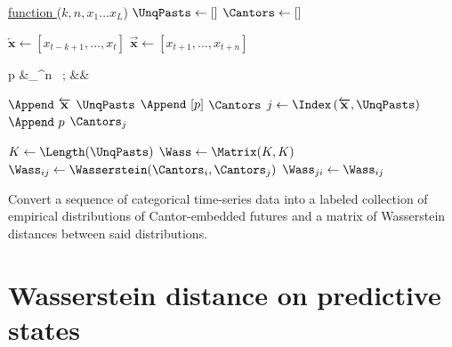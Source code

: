 \documentclass[draft,aps,pre,twocolumn,groupaddress,showkeys,nofootinbib,preprintnumbers,floatfix]{revtex4-2}
\begin{document}
\begin{algorithm}[t]
   
  
  \underline{function \CantorWasserstein} ($k,n,x_1\dots x_L$)\;
  $\UnqPasts \leftarrow \left[\right]$\; 
  $\Cantors \leftarrow \left[\right]$\; 
   { 
    $\overleftarrow{\mathbf{x}} \leftarrow \left[x_{t-k+1},\dots, x_{t}\right]$\;
    $\overrightarrow{\mathbf{x}} \leftarrow \left[x_{t+1},\dots, x_{t+n}\right]$\;
      \vspace{-1.5em}
      \begin{flalign*}
        p &\leftarrow \sum_{}^n
        \ ; &&
      \end{flalign*}

       { 
        $\Append\ \overleftarrow{\mathbf{x}}$ \KwTo $\UnqPasts$\; 
        $\Append\ [p]$ \KwTo $\Cantors$\; 
        } { 
        $j \leftarrow \Index\left(\overleftarrow{\mathbf{x}},\UnqPasts\right)$\;
        $\Append\ p$ \KwTo $\Cantors_j$\; 
        } 
  }
  $K \leftarrow \Length(\UnqPasts)$\; 
  $\Wass \leftarrow \Matrix(K,K)$\;
   { 
     {  
      $\Wass_{ij}
        \leftarrow
        \Wasserstein(\Cantors_i,\Cantors_j)$\;
        $\Wass_{j i} \leftarrow \Wass_{i j}$\; } } 
  \KwResult{$\UnqPasts$,$\Cantors$,$\Wass$}
\caption{Convert a sequence of categorical time-series data into a labeled
	collection of empirical distributions of Cantor-embedded futures and a
	matrix of Wasserstein distances between said distributions.
	}
\label{alg:cantorwass}
\end{algorithm}

\section{Wasserstein distance on predictive states}
\end{document}
